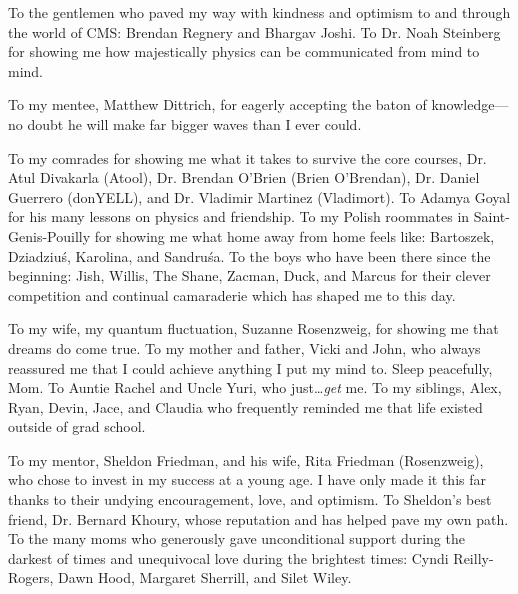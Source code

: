 To the gentlemen who paved my way with kindness and optimism to and through the world of CMS: Brendan Regnery and Bhargav Joshi.
To Dr. Noah Steinberg for showing me how majestically physics can be communicated from mind to mind.


To my mentee, Matthew Dittrich, for eagerly accepting the baton of knowledge---no doubt he will make far bigger waves than I ever could.

To my comrades for showing me what it takes to survive the core courses, Dr. Atul Divakarla (Atool), Dr. Brendan O'Brien (Brien O'Brendan), Dr. Daniel Guerrero (donYELL), and Dr. Vladimir Martinez (Vladimort).
To Adamya Goyal for his many lessons on physics and friendship.
To my Polish roommates in Saint-Genis-Pouilly for showing me what home away from home feels like: Bartoszek, Dziadziuś, Karolina, and Sandruśa.
To the boys who have been there since the beginning: Jish, Willis, The Shane, Zacman, Duck, and Marcus for their clever competition and continual camaraderie which has shaped me to this day.

To my wife, my quantum fluctuation, Suzanne Rosenzweig, for showing me that dreams do come true.
To my mother and father, Vicki and John, who always reassured me that I could achieve anything I put my mind to. Sleep peacefully, Mom.
To Auntie Rachel and Uncle Yuri, who just\ldots \emph{get} me. %
To my siblings, Alex, Ryan, Devin, Jace, and Claudia who frequently reminded me that life existed outside of grad school.

To my mentor, Sheldon Friedman, and his wife, Rita Friedman (Rosenzweig), who chose to invest in my success at a young age.
I have only made it this far thanks to their undying encouragement, love, and optimism.
To Sheldon's best friend, Dr. Bernard Khoury, whose reputation and has helped pave my own path.
To the many moms who generously gave unconditional support during the darkest of times and unequivocal love during the brightest times:
Cyndi Reilly-Rogers, Dawn Hood, Margaret Sherrill, and Silet Wiley.

